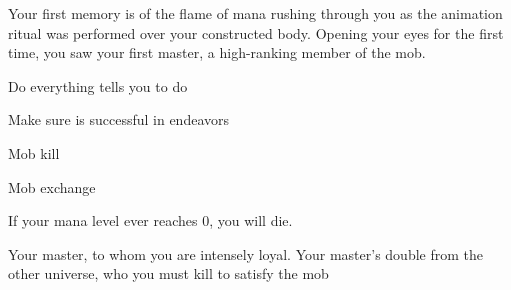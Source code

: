 \documentclass[char]{guildcamp3}
\begin{document}
Your first memory is of the flame of mana rushing through you as the animation ritual was performed over your constructed body. Opening your eyes for the first time, you saw your first master, a high-ranking member of the mob.

\begin{itemz}[Goals]
  \item Do everything \cNobleOne{} tells you to do
  \item Make sure \cNobleOne{} is successful in \cNobleOne{\their} endeavors
  \item Mob kill
  \item Mob exchange
\end{itemz}

\begin{itemz}[Notes]
  \item If your mana level ever reaches 0, you will die.
\end{itemz}


\begin{contacts}
  \contact{\cNobleOne{}} Your master, to whom you are intensely loyal.
  \contact{\cPoliOne{}} Your master's double from the other universe, who you must kill to satisfy the mob
\end{contacts}
\end{document}
